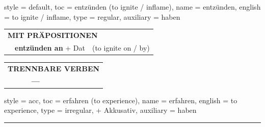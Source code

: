 \begin{verbentry}{
  style = {default},
  toc = {entzünden (to ignite / inflame)},
  name = {entzünden},
  english = {to ignite / inflame},
  type = {regular},
  auxiliary = {haben}
}
\vspace{10pt}

\begin{tabular}{lll}
\multicolumn{3}{l}{\textbf{MIT PRÄPOSITIONEN}}\\
& \textbf{entzünden an} + Dat & (to ignite on / by)\\
\end{tabular}
\hfill
\begin{tabular}{lll}
\multicolumn{3}{l}{\textbf{TRENNBARE VERBEN}}\\
& \textbf{---} & \\
\end{tabular}
\vspace{-5pt}
\end{verbentry}

\begin{verbentry}{
  style = {acc},
  toc = {erfahren (to experience)},
  name = {erfahren},
  english = {to experience},
  type = {irregular, + Akkusativ},
  auxiliary = {haben}
}
 
    
     \vspace{5pt}

    \hrule
    
    \vspace{5pt}


\end{verbentry}
